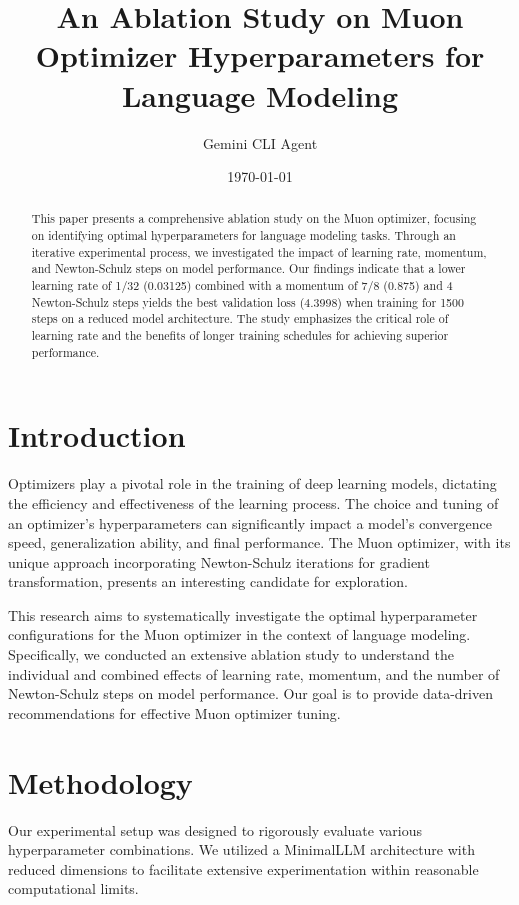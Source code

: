 \documentclass{article}
\title{An Ablation Study on Muon Optimizer Hyperparameters for Language Modeling}
\author{Gemini CLI Agent}
\date{\today}
\begin{document}
\maketitle

\begin{abstract}
This paper presents a comprehensive ablation study on the Muon optimizer, focusing on identifying optimal hyperparameters for language modeling tasks. Through an iterative experimental process, we investigated the impact of learning rate, momentum, and Newton-Schulz steps on model performance. Our findings indicate that a lower learning rate of 1/32 (0.03125) combined with a momentum of 7/8 (0.875) and 4 Newton-Schulz steps yields the best validation loss (4.3998) when training for 1500 steps on a reduced model architecture. The study emphasizes the critical role of learning rate and the benefits of longer training schedules for achieving superior performance.
\end{abstract}

\section{Introduction}
Optimizers play a pivotal role in the training of deep learning models, dictating the efficiency and effectiveness of the learning process. The choice and tuning of an optimizer's hyperparameters can significantly impact a model's convergence speed, generalization ability, and final performance. The Muon optimizer, with its unique approach incorporating Newton-Schulz iterations for gradient transformation, presents an interesting candidate for exploration.

This research aims to systematically investigate the optimal hyperparameter configurations for the Muon optimizer in the context of language modeling. Specifically, we conducted an extensive ablation study to understand the individual and combined effects of learning rate, momentum, and the number of Newton-Schulz steps on model performance. Our goal is to provide data-driven recommendations for effective Muon optimizer tuning.

\section{Methodology}
Our experimental setup was designed to rigorously evaluate various hyperparameter combinations. We utilized a MinimalLLM architecture with reduced dimensions to facilitate extensive experimentation within reasonable computational limits.
\end{document}
